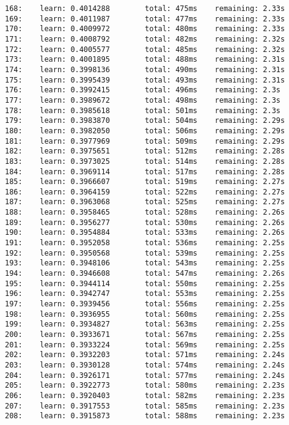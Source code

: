 \documentclass[11pt]{article}
\begin{document}
\begin{Verbatim}[commandchars=\\\{\}]
168:    learn: 0.4014288        total: 475ms    remaining: 2.33s
169:    learn: 0.4011987        total: 477ms    remaining: 2.33s
170:    learn: 0.4009972        total: 480ms    remaining: 2.33s
171:    learn: 0.4008792        total: 482ms    remaining: 2.32s
172:    learn: 0.4005577        total: 485ms    remaining: 2.32s
173:    learn: 0.4001895        total: 488ms    remaining: 2.31s
174:    learn: 0.3998136        total: 490ms    remaining: 2.31s
175:    learn: 0.3995439        total: 493ms    remaining: 2.31s
176:    learn: 0.3992415        total: 496ms    remaining: 2.3s
177:    learn: 0.3989672        total: 498ms    remaining: 2.3s
178:    learn: 0.3985618        total: 501ms    remaining: 2.3s
179:    learn: 0.3983870        total: 504ms    remaining: 2.29s
180:    learn: 0.3982050        total: 506ms    remaining: 2.29s
181:    learn: 0.3977969        total: 509ms    remaining: 2.29s
182:    learn: 0.3975651        total: 512ms    remaining: 2.28s
183:    learn: 0.3973025        total: 514ms    remaining: 2.28s
184:    learn: 0.3969114        total: 517ms    remaining: 2.28s
185:    learn: 0.3966607        total: 519ms    remaining: 2.27s
186:    learn: 0.3964159        total: 522ms    remaining: 2.27s
187:    learn: 0.3963068        total: 525ms    remaining: 2.27s
188:    learn: 0.3958465        total: 528ms    remaining: 2.26s
189:    learn: 0.3956277        total: 530ms    remaining: 2.26s
190:    learn: 0.3954884        total: 533ms    remaining: 2.26s
191:    learn: 0.3952058        total: 536ms    remaining: 2.25s
192:    learn: 0.3950568        total: 539ms    remaining: 2.25s
193:    learn: 0.3948106        total: 543ms    remaining: 2.25s
194:    learn: 0.3946608        total: 547ms    remaining: 2.26s
195:    learn: 0.3944114        total: 550ms    remaining: 2.25s
196:    learn: 0.3942747        total: 553ms    remaining: 2.25s
197:    learn: 0.3939456        total: 556ms    remaining: 2.25s
198:    learn: 0.3936955        total: 560ms    remaining: 2.25s
199:    learn: 0.3934827        total: 563ms    remaining: 2.25s
200:    learn: 0.3933671        total: 567ms    remaining: 2.25s
201:    learn: 0.3933224        total: 569ms    remaining: 2.25s
202:    learn: 0.3932203        total: 571ms    remaining: 2.24s
203:    learn: 0.3930128        total: 574ms    remaining: 2.24s
204:    learn: 0.3926171        total: 577ms    remaining: 2.24s
205:    learn: 0.3922773        total: 580ms    remaining: 2.23s
206:    learn: 0.3920403        total: 582ms    remaining: 2.23s
207:    learn: 0.3917553        total: 585ms    remaining: 2.23s
208:    learn: 0.3915873        total: 588ms    remaining: 2.23s

\end{Verbatim}
\end{document}
